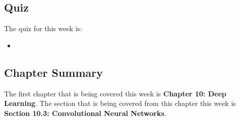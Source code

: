 \subsection{Quiz}

The quiz for this week is:

\begin{itemize}
    \item {}
\end{itemize}

\newpage

\subsection{Chapter Summary}

The first chapter that is being covered this week is \textbf{Chapter 10: Deep Learning}. The section that is being covered from this chapter this week is \textbf{Section 10.3: Convolutional Neural Networks}.

